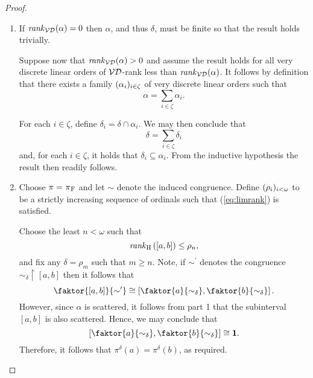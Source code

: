 \begin{proof}\leavevmode
	\begin{enumerate}[topsep=0pt]
		\item If $\mathit{rank}_\mathcal{VD}(\alpha)=0$ then $\alpha$, and thus $\delta$, must be
			finite so that the result holds trivially.

			Suppose now that $\mathit{rank}_\mathcal{VD}(\alpha)>0$ and assume the result holds for
			all very discrete linear orders of $\mathcal{VD}$-rank less than
			$\mathit{rank}_\mathcal{VD}(\alpha)$.  It follows by definition that there exists
			a family $(\alpha_i)_{i\in\zeta}$ of very discrete linear
			orders such that
			\begin{equation}
				\alpha=\sum_{i\in\zeta}\alpha_i.
			\end{equation}

			For each $i\in\zeta$, define $\delta_i=\delta\cap\alpha_i$.  We may
			then conclude that
			\begin{equation}
				\delta=\sum_{i\in\zeta}\delta_i
			\end{equation}
			and, for each $i\in\zeta$, it holds that
			$\delta_i\subseteq\alpha_i$.  From the inductive hypothesis the
			result then readily follows.
			\smallskip

		\item Choose $\pi=\prescript{}{}{\pi}_\mathrm{F}$ and let $\sim$ denote the induced congruence.
			Define $(\rho_i)_{i<\omega}$ to be a strictly increasing
			sequence of ordinals such that (\ref{eq:limrank}) is
			satisfied.

			Choose the least $n<\omega$ such that
			\begin{equation}
				\mathit{rank}_\mathrm{H}\left([a,b]\right)\leq\rho_n,
			\end{equation}
			and fix any $\delta=\rho_m$ such that $m\geq n$.  Note, if
			$\sim^\prime$ denotes the congruence
			$\sim_\delta\restriction[a,b]$ then it follows that
			\begin{equation}
				\faktor{[a,b]}{\sim^\prime}\cong
				\left[\faktor{a}{\sim_\delta}\mathpunct{,}\faktor{b}{\sim_\delta}\right].
			\end{equation}
			However, since $\alpha$ is scattered, it follows from part 1 that
			the subinterval $[a,b]$ is also scattered.  Hence, we may conclude
			that
			\begin{equation}
				\left[\faktor{a}{\sim_\delta},\faktor{b}{\sim_\delta}\right]\cong\one.
			\end{equation}
			Therefore, it follows that $\pi^\delta(a)=\pi^\delta(b)$, as
			required.
	\end{enumerate}
\end{proof}

